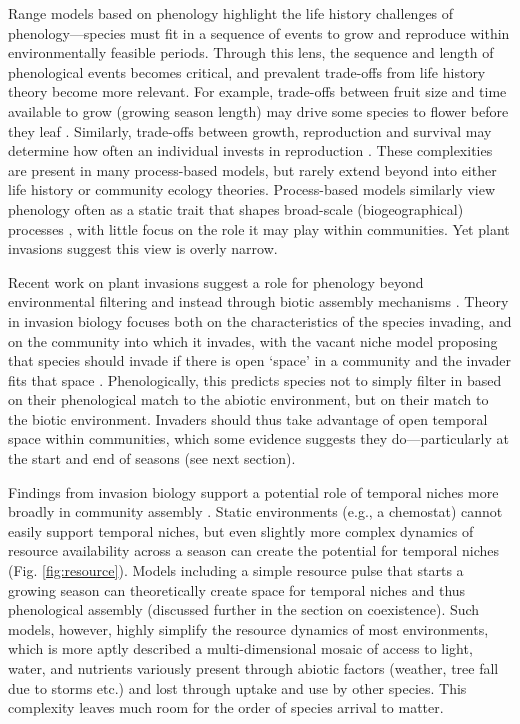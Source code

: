 \documentclass[11pt]{article}
\begin{document}
Range models based on phenology highlight the life history challenges of phenology---species must fit in a sequence of events to grow and reproduce within environmentally feasible periods. Through this lens, the sequence and length of phenological events becomes critical, and prevalent trade-offs from life history theory become more relevant. For example, trade-offs between fruit size and time available to grow (growing season length) may drive some species to flower before they leaf \citep{dan2021nph}. Similarly, trade-offs between growth, reproduction and survival may determine how often an individual invests in reproduction \citep{schaffer1974optimal,law1979cost,stearns1998evolution}. These complexities are present in many process-based models, but rarely extend beyond into either life history or community ecology theories. Process-based models similarly view phenology often as a static trait that shapes broad-scale (biogeographical) processes \citep{Chuine:2010gm}, with little focus on the role it may play within communities. Yet plant invasions suggest this view is overly narrow.

Recent work on plant invasions suggest a role for phenology beyond environmental filtering and instead through biotic assembly mechanisms \citep{wolkovich2011phenology,Fridley:2012fj}. Theory in invasion biology focuses both on the characteristics of the species invading, and on the community into which it invades, with the vacant niche model proposing that species should invade if there is open `space' in a community and the invader fits that space \citep{Elton:1958bk}. Phenologically, this predicts species not to simply filter in based on their phenological match to the abiotic environment, but on their match to the biotic environment. Invaders should thus take advantage of open temporal space within communities, which some evidence suggests they do---particularly at the start and end of seasons (see next section). 

Findings from invasion biology support a potential role of temporal niches more broadly in community assembly \citep{gotelli1996}. Static environments (e.g., a chemostat) cannot easily support temporal niches, but even slightly more complex dynamics of resource availability across a season can create the potential for temporal niches (Fig. \ref{fig:resource}). Models including a simple resource pulse that starts a growing season can theoretically create space for temporal niches and thus phenological assembly (discussed further in the section on coexistence). Such models, however, highly simplify the resource dynamics of most environments, which is more aptly described a multi-dimensional mosaic of access to light, water, and nutrients variously present through abiotic factors (weather, tree fall due to storms etc.) and lost through uptake and use by other species. This complexity leaves much room for the order of species arrival to matter.
\end{document}
